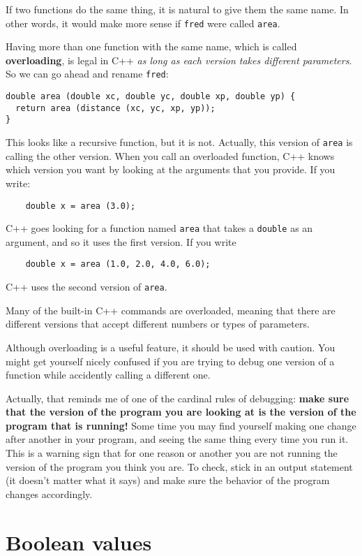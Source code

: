 If two functions do the same thing, it is natural to give them
the same name.  In other words, it would make more sense if
{\tt fred} were called {\tt area}.

Having more than one function with the same name, which is called {\bf
overloading}, is legal in C++ {\em as long as each version takes
different parameters}.  So we can go ahead and rename {\tt fred}:

\begin{verbatim}
double area (double xc, double yc, double xp, double yp) {
  return area (distance (xc, yc, xp, yp));
} 
\end{verbatim}
%
This looks like a recursive function, but it is not.  Actually,
this version of {\tt area} is calling the other version.
When you call an overloaded function, C++ knows which version you
want by looking at the arguments that you provide.  If you write:

\begin{verbatim}
    double x = area (3.0);
\end{verbatim}
%
C++ goes looking for a function named {\tt area} that
takes a {\tt double} as an argument, and so it uses the
first version.  If you write

\begin{verbatim}
    double x = area (1.0, 2.0, 4.0, 6.0);
\end{verbatim}
%
C++ uses the second version of {\tt area}.  

Many of the built-in C++ commands are overloaded, meaning that there
are different versions that accept different numbers or types of
parameters.

Although overloading is a useful feature, it should be used with
caution.  You might get yourself nicely confused if you are trying to
debug one version of a function while accidently calling a different
one.

Actually, that reminds me of one of the cardinal rules of debugging:
{\bf make sure that the version of the program you are looking at is
the version of the program that is running!}  Some time you may find
yourself making one change after another in your program, and seeing
the same thing every time you run it.  This is a warning sign that for
one reason or another you are not running the version of the program
you think you are.  To check, stick in an output statement (it
doesn't matter what it says) and make sure the behavior of the
program changes accordingly.

\section{Boolean values}


